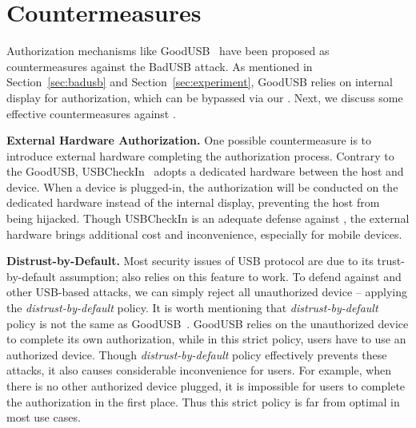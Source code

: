 \section{Countermeasures}
\label{sec:countermeasures}

Authorization mechanisms like GoodUSB~\cite{tian2015defending} have been
proposed as countermeasures against the BadUSB attack. As mentioned in
Section~\ref{sec:badusb} and Section~\ref{sec:experiment}, GoodUSB relies on
internal display for authorization, which can be bypassed via our \tool. 
Next, we discuss some effective countermeasures against \tool.

\textbf{External Hardware Authorization.} One possible countermeasure is to
introduce external hardware completing the authorization process. Contrary to
the GoodUSB, USBCheckIn~\cite{usbcheckin} adopts a dedicated hardware between
the host and device. When a device is plugged-in, the authorization will be
conducted on the dedicated hardware instead of the internal display, preventing
the host from being hijacked. Though USBCheckIn is an adequate defense against
\tool, the external hardware brings additional cost and inconvenience,
especially for mobile devices.

\textbf{Distrust-by-Default.} Most security issues of USB protocol are due to
its {trust-by-default} assumption; \tool also relies on this feature to work.
To defend against \tool and other USB-based attacks, we can simply reject all
{unauthorized} device -- applying the \textit{distrust-by-default} policy.  It
is worth mentioning that \textit{distrust-by-default} policy is not the same as
GoodUSB~\cite{tian2015defending}.   GoodUSB relies on the {unauthorized} device to
complete its own authorization, while in this strict policy, users have to use
an {authorized} device. Though \textit{distrust-by-default} policy effectively
prevents these attacks, it also causes considerable inconvenience for users.
For example, when there is no other {authorized} device plugged, it is
impossible for users to complete the authorization in the first place. Thus
this strict policy is far from optimal in most use cases.

